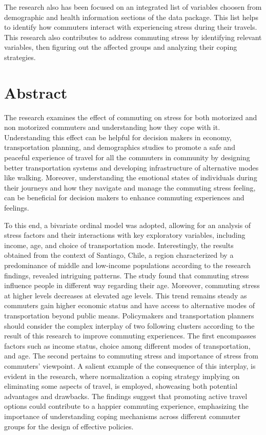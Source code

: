 \documentclass[
11pt, %
oneside, %
english, %
singlespacing, %
]{macthesis} %
\begin{document}
  The research also has been focused on an integrated list of variables choosen from demographic and health information sections of the data package. This list helps to identify how commuters interact with experiencing stress during their travels. This research also contributes to address commuting stress by identifying relevant variables, then figuring out the affected groups and analyzing their coping strategies.
\clearpage



\section*{Abstract}
\addchaptertocentry{\abstractname}
The research examines the effect of commuting on stress for both motorized and non motorized commuters and understanding how they cope with it. Understanding this effect can be helpful for decision makers in economy, transportation planning, and demographics studies to promote a safe and peaceful experience of travel for all the commuters in community by designing better transportation systems and developing infrastructure of alternative modes like walking. Moreover, understanding the emotional states of individuals during their journeys and how they navigate and manage the commuting stress feeling, can be beneficial for decision makers to enhance commuting experiences and feelings.

To this end, a bivariate ordinal model was adopted, allowing for an analysis of stress factors and their interactions with key exploratory variables, including income, age, and choice of transportation mode. Interestingly, the results obtained from the context of Santiago, Chile, a region characterized by a predominance of middle and low-income populations according to the research findings, revealed intriguing patterns. The study found that commuting stress influence people in different way regarding their age. Moreover, commuting stress at higher levels decreases at elevated age levels. This trend remains steady as commuters gain higher economic status and have access to alternative modes of transportation beyond public means. Policymakers and transportation planners should consider the complex interplay of two following clusters according to the result of this research to improve commuting experiences. The first encompasses factors such as income status, choice among different modes of transportation, and age. The second pertains to commuting stress and importance of stress from commuters' viewpoint. A salient example of the consequence of this interplay, is evident in the research, where normalization a coping strategy implying on eliminating some aspects of travel, is employed, showcasing both potential advantages and drawbacks. The findings suggest that promoting active travel options could contribute to a happier commuting experience, emphasizing the importance of understanding coping mechanisms across different commuter groups for the design of effective policies.
\end{document}

